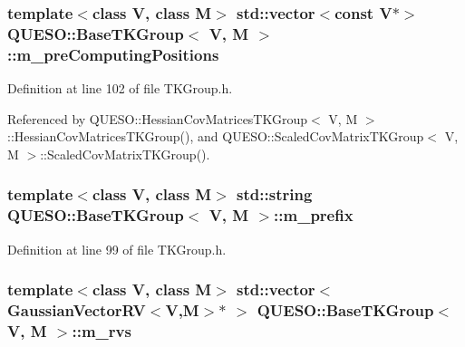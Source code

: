 \hypertarget{class_q_u_e_s_o_1_1_base_t_k_group_a93d7fe55e30a7c6f209b01cb8a67e322}{
\subsubsection[{m\-\_\-pre\-Computing\-Positions}]{\setlength{\rightskip}{0pt plus 5cm}template$<$class V, class M$>$ std\-::vector$<$const V$\ast$$>$ {\bf Q\-U\-E\-S\-O\-::\-Base\-T\-K\-Group}$<$ V, M $>$\-::m\-\_\-pre\-Computing\-Positions\hspace{0.3cm}{\ttfamily [protected]}}}\label{class_q_u_e_s_o_1_1_base_t_k_group_a93d7fe55e30a7c6f209b01cb8a67e322}


Definition at line 102 of file T\-K\-Group.\-h.



Referenced by Q\-U\-E\-S\-O\-::\-Hessian\-Cov\-Matrices\-T\-K\-Group$<$ V, M $>$\-::\-Hessian\-Cov\-Matrices\-T\-K\-Group(), and Q\-U\-E\-S\-O\-::\-Scaled\-Cov\-Matrix\-T\-K\-Group$<$ V, M $>$\-::\-Scaled\-Cov\-Matrix\-T\-K\-Group().

\hypertarget{class_q_u_e_s_o_1_1_base_t_k_group_a7c77e4969de60624dba1049cf44a1ab6}{
\subsubsection[{m\-\_\-prefix}]{\setlength{\rightskip}{0pt plus 5cm}template$<$class V, class M$>$ std\-::string {\bf Q\-U\-E\-S\-O\-::\-Base\-T\-K\-Group}$<$ V, M $>$\-::m\-\_\-prefix\hspace{0.3cm}{\ttfamily [protected]}}}\label{class_q_u_e_s_o_1_1_base_t_k_group_a7c77e4969de60624dba1049cf44a1ab6}


Definition at line 99 of file T\-K\-Group.\-h.

\hypertarget{class_q_u_e_s_o_1_1_base_t_k_group_a87c6b02ea45ab3de634c22afa58f53a5}{
\subsubsection[{m\-\_\-rvs}]{\setlength{\rightskip}{0pt plus 5cm}template$<$class V, class M$>$ std\-::vector$<${\bf Gaussian\-Vector\-R\-V}$<$V,M$>$$\ast$ $>$ {\bf Q\-U\-E\-S\-O\-::\-Base\-T\-K\-Group}$<$ V, M $>$\-::m\-\_\-rvs\hspace{0.3cm}{\ttfamily [protected]}}}\label{class_q_u_e_s_o_1_1_base_t_k_group_a87c6b02ea45ab3de634c22afa58f53a5}


